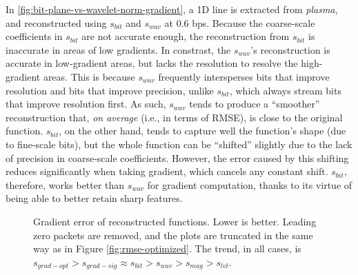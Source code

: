 In \autoref{fig:bit-plane-vs-wavelet-norm-gradient}, a 1D line is extracted from \emph{plasma}, and
reconstructed using $s_{bit}$ and $s_{wav}$ at 0.6 bps. Because the coarse-scale coefficients in
$s_{bit}$ are not accurate enough, the reconstruction from $s_{bit}$ is inaccurate in areas of low
gradients. In constrast, the $s_{wav}$'s reconstruction is accurate in low-gradient areas, but lacks
the resolution to resolve the high-gradient areas. This is because $s_{wav}$ frequently intersperses
bits that improve resolution and bits that improve precision, unlike $s_{bit}$, which always stream
bits that improve resolution first. As such, $s_{wav}$ tends to produce a ``smoother''
reconstruction that, \emph{on average} (i.e., in terms of RMSE), is close to the original function.
$s_{bit}$, on the other hand, tends to capture well the function's shape (due to fine-scale bits),
but the whole function can be ``shifted'' slightly due to the lack of precision in coarse-scale
coefficients. However, the error caused by this shifting reduces significantly when taking gradient,
which cancels any constant shift. $s_{bit}$, therefore, works better than $s_{wav}$ for gradient
computation, thanks to its virtue of being able to better retain sharp features.

\begin{figure}[h]
	\centering
	 \caption{Gradient
	error of reconstructed functions. Lower is better. Leading zero packets are removed, and the plots
	are truncated in the same way as in Figure \ref{fig:rmse-optimized}. The trend, in all cases, is
	$s_{grad-opt} > s_{grad-sig} \approx s_{bit} > s_{wav} > s_{mag} > s_{lvl}$.}
	\label{fig:gradient-error-comparison}
\end{figure}


